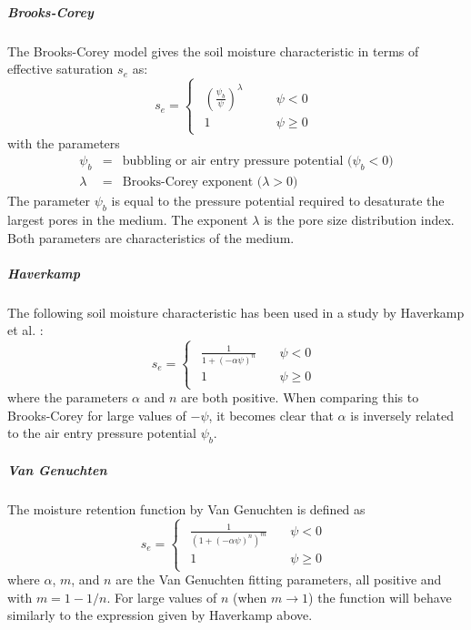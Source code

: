 \documentclass[fleqn]{article}
\begin{document}
\subparagraph{Brooks-Corey}
The Brooks-Corey model \cite{brookscorey1966} gives the soil
moisture characteristic in terms of effective saturation $s_e$ as:
\begin{equation}
  s_e =
  \begin{cases}
    \begin{aligned}
      \left( \frac{\psi_b}{\psi} \right)^{\lambda} & \quad & \psi < 0    \\
      1                                            & \quad & \psi \geq 0
    \end{aligned}
  \end{cases}
  \label{eq-seff-BrooksCorey}
\end{equation}
with the parameters
\begin{eqnarray*}
  \psi_b  &=& \text{bubbling or air entry pressure potential ($\psi_b < 0$)}\\
  \lambda &=& \text{Brooks-Corey exponent ($\lambda>0$)}
\end{eqnarray*}
The parameter $\psi_b$ is equal to the pressure potential required 
to desaturate the largest pores in the medium. The exponent $\lambda$
is the pore size distribution index. Both parameters are characteristics
of the medium.

\subparagraph{Haverkamp}
The following soil moisture characteristic has been used in a study by
Haverkamp et al. \cite{haverkampetal-1977}:
\begin{equation}
  s_e =
  \begin{cases}
    \begin{aligned}
      \frac{1}
      {
        1 + \left( -\alpha\psi \right)^{n}
      } \quad & \psi < 0    \\
      1 \quad & \psi \geq 0
    \end{aligned}
  \end{cases}
  \label{eq-seff-Haverkamp}
\end{equation}
where the parameters $\alpha$ and $n$ are both positive. 
When comparing this to Brooks-Corey for large values of $-\psi$,
it becomes clear that $\alpha$ is inversely related to the air entry 
pressure potential $\psi_b$.

\subparagraph{Van Genuchten}
The moisture retention function by Van Genuchten \cite{vangenuchten-1980}
is defined as
\begin{equation}
  s_e =
  \begin{cases}
    \begin{aligned}
      \frac{1}
      {
        \left( 1 + \left( -\alpha\psi \right)^{n}
        \right)^{m}
      } \quad & \psi < 0    \\
      1 \quad & \psi \geq 0
    \end{aligned}
  \end{cases}
  \label{eq-seff-vanGenuchten}
\end{equation}
where $\alpha$, $m$, and $n$ are the Van Genuchten fitting parameters, 
all positive and with $m = 1 - 1/n$. For large
values of $n$ (when $m \rightarrow 1$) the function will behave similarly
to the expression given by Haverkamp above.
\end{document}
